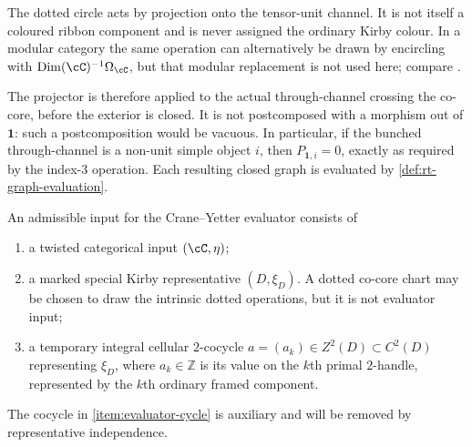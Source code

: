 \begin{remark}
\label{rem:dotted-circle-operation-scope}
The dotted circle acts by projection onto the tensor-unit channel.  It is not
itself a coloured ribbon component and is never assigned the ordinary Kirby
colour.  In a modular category the same operation can alternatively be drawn
by encircling with $\operatorname{Dim}(\cC)^{-1}\Omega_{\cC}$, but that
modular replacement is not used here; compare
\cite[Definition~5.11 and Lemma~2.31]{Tham2021}.

The projector is therefore applied to the actual through-channel crossing the
co-core, before the exterior is closed.  It is not postcomposed with a
morphism out of $\mathbf1$: such a postcomposition would be vacuous.  In
particular, if the bunched through-channel is a non-unit simple object $i$,
then $P_{\mathbf1,i}=0$, exactly as required by the index-$3$ operation.
Each resulting closed graph is evaluated by
\cref{def:rt-graph-evaluation}.
\end{remark}

\begin{definition}
\label{def:admissible-diagrammatic-input}
An admissible input for the Crane--Yetter evaluator consists of
\begin{enumerate}[label=(\roman*),ref=\roman*]
  \item\label{item:evaluator-category}
  a twisted categorical input $(\cC,\eta)$;

  \item\label{item:evaluator-diagram}
  a marked special Kirby representative $(D,\xi_D)$.  A dotted co-core chart may be
  chosen to draw the intrinsic dotted operations, but it is not evaluator
  input;

  \item\label{item:evaluator-cycle}
  a temporary integral cellular $2$-cocycle
  $a=(a_k)\in Z^2(D)\subset C^2(D)$ representing $\xi_D$, where
  $a_k\in\mathbb Z$ is its value on the $k$th primal $2$-handle, represented
  by the $k$th ordinary framed component.
\end{enumerate}
\end{definition}

\begin{remark}
\label{rem:admissible-input-auxiliary-cocycle}
The cocycle in \cref{item:evaluator-cycle} is auxiliary and will be
removed by representative independence.
\end{remark}

